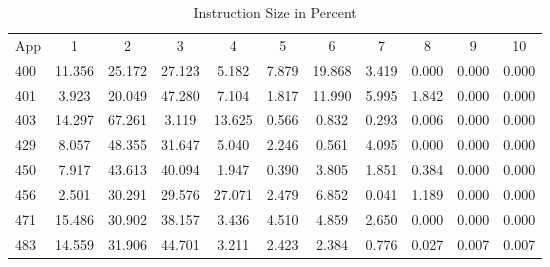 \begin{Solution}
\begin{table}[H]
    \centering
    \caption{Instruction Size in Percent}
    \label{tab:pD:instr_size}
    \begin{tabular}{| l | c | c | c | c | c | c | c | c | c | c |}
        \hline
        \multirow{2}{*}{App} & \multirow{2}{*}{1} & \multirow{2}{*}{2} & \multirow{2}{*}{3} & \multirow{2}{*}{4} & \multirow{2}{*}{5} & \multirow{2}{*}{6} & \multirow{2}{*}{7} & \multirow{2}{*}{8} & \multirow{2}{*}{9} & \multirow{2}{*}{10} \\
        & & & & & & & & & & \\
        \hline
        400 & 11.356 & 25.172 & 27.123 & 5.182 & 7.879 & 19.868 & 3.419 & 0.000 & 0.000 & 0.000 \\
        \hline
        401 & 3.923 & 20.049 & 47.280 & 7.104 & 1.817 & 11.990 & 5.995 & 1.842 & 0.000 & 0.000 \\
        \hline
        403 & 14.297 & 67.261 & 3.119 & 13.625 & 0.566 & 0.832 & 0.293 & 0.006 & 0.000 & 0.000 \\
        \hline
        429 & 8.057 & 48.355 & 31.647 & 5.040 & 2.246 & 0.561 & 4.095 & 0.000 & 0.000 & 0.000 \\
        \hline
        450 & 7.917 & 43.613 & 40.094 & 1.947 & 0.390 & 3.805 & 1.851 & 0.384 & 0.000 & 0.000 \\
        \hline
        456 & 2.501 & 30.291 & 29.576 & 27.071 & 2.479 & 6.852 & 0.041 & 1.189 & 0.000 & 0.000 \\
        \hline
        471 & 15.486 & 30.902 & 38.157 & 3.436 & 4.510 & 4.859 & 2.650 & 0.000 & 0.000 & 0.000 \\
        \hline
        483 & 14.559 & 31.906 & 44.701 & 3.211 & 2.423 & 2.384 & 0.776 & 0.027 & 0.007 & 0.007\\
        \hline
    \end{tabular}
\end{table}


\end{Solution}
